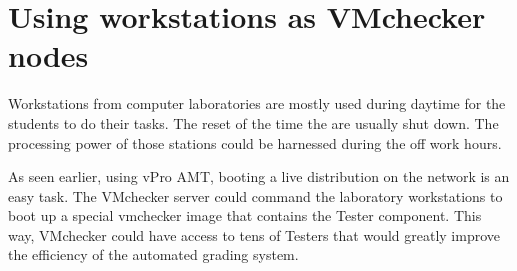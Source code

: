 \section{Using workstations as VMchecker nodes}

Workstations from computer laboratories are mostly used during daytime
for the students to do their tasks. The reset of the time the are
usually shut down. The processing power of those stations could be
harnessed during the off work hours.

As seen earlier, using vPro \ac{AMT}, booting a live distribution on the
network is an easy task. The VMchecker server could command the
laboratory workstations to boot up a special vmchecker image that
contains the Tester component. This way, VMchecker could have access to
tens of Testers that would greatly improve the efficiency  of the
automated grading system.
